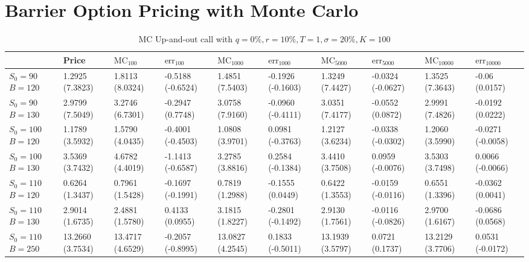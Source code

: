 \chapter{Barrier Option Pricing with Monte Carlo}
\begin{center}
	\begin{table}[H]
		\begin{tabular}{ | m{4em} | m{1.4cm}| m{1.4cm} | m{1.4cm}| m{1.4cm} | m{1.37cm} | m{1.4cm} | m{1.4cm} | m{1.4cm} | m{1.45cm} |} 
			\hline
			& Price & $\text{MC}_{100}$ & $\text{err}_{100}$ & $\text{MC}_{1000}$ & $\text{err}_{1000}$ & $\text{MC}_{5000}$ & $\text{err}_{5000}$ & $\text{MC}_{10000}$ & $\text{err}_{10000}$  \\ 
			\hline
			$S_0=90$ $B=120$ & 1.2925 (7.3823) & 1.8113 (8.0324)  & -0.5188 (-0.6524) & 1.4851 (7.5403) & -0.1926 (-0.1603) & 1.3249 (7.4427) & -0.0324 (-0.0627) & 1.3525 (7.3643) & -0.06 (0.0157) \\ 
			\hline
			$S_0=90$ $B=130$ & 2.9799 (7.5049) & 3.2746 (6.7301) & -0.2947 (0.7748) & 3.0758 (7.9160) & -0.0960 (-0.4111) &  3.0351 (7.4177) & -0.0552 (0.0872) & 2.9991 (7.4826) & -0.0192 (0.0222) \\ 
			\hline
			$S_0=100$ $B=120$ & 1.1789 (3.5932) & 1.5790 (4.0435) & -0.4001 (-0.4503) & 1.0808 (3.9701)  & 0.0981 (-0.3763) & 1.2127 (3.6234) & -0.0338 (-0.0302) & 1.2060 (3.5990) & -0.0271 (-0.0058) \\ 
			\hline
			$S_0=100$ $B=130$ & 3.5369 (3.7432) & 4.6782 (4.4019)  & -1.1413 (-0.6587) & 3.2785 (3.8816) & 0.2584 (-0.1384) & 3.4410 (3.7508) & 0.0959 (-0.0076) & 3.5303 (3.7498)  & 0.0066 (-0.0066)\\ 
			\hline 
			$S_0=110$ $B=120$ & 0.6264 (1.3437) & 0.7961 (1.5428) & -0.1697 (-0.1991) & 0.7819 (1.2988) & -0.1555 (0.0449) & 0.6422 (1.3553) & -0.0159 (-0.0116) & 0.6551 (1.3396) & -0.0362 (0.0041) \\
			\hline
			$S_0=110$ $B=130$ & 2.9014 (1.6735) & 2.4881 (1.5780)  & 0.4133 (0.0955) & 3.1815 (1.8227) & -0.2801 (-0.1492) & 2.9130 (1.7561) & -0.0116 (-0.0826) & 2.9700 (1.6167) & -0.0686 (0.0568)\\
			\hline
			$S_0=110$ $B=250$ & 13.2660 (3.7534) & 13.4717 (4.6529)  & -0.2057 (-0.8995) & 13.0827 (4.2545) & 0.1833 (-0.5011) & 13.1939 (3.5797) & 0.0721 (0.1737) & 13.2129 (3.7706) & 0.0531 (-0.0172)\\
		\hline
		\end{tabular}
		\caption{MC Up-and-out call with $q=0\%,r=10\%, T=1,\sigma=20\%,K=100$}
		\label{tab:MC_barrer}
	\end{table}
\end{center}
